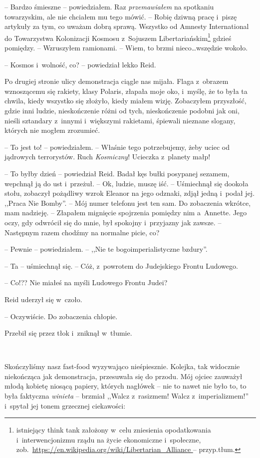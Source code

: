 \documentclass[oneside,polish,11pt,sfheadings]{mwbk}
\begin{document}
-- Bardzo śmieszne -- powiedziałem. Raz \emph{przemawiałem} na spotkaniu
towarzyskim, ale nie chciałem mu tego mówić. -- Robię dziwną pracę i~piszę artykuły za tym, co uważam dobrą sprawą. Wszystko od Amnesty
International do Towarzystwa Kolonizacji Kosmosu z~Sojuszem
Libertariańskim\footnote {istniejący think tank założony w~celu zniesienia opodatkowania i~interwencjonizmu rządu na życie ekonomiczne i~społeczne,
zob.~\url{https://en.wikipedia.org/wiki/Libertarian_Alliance
} -- przyp.tłum.} gdzieś pomiędzy. -- Wzruszyłem ramionami. -- Wiem, to brzmi nieco\ldots wszędzie wokoło.

-- Kosmos i~wolność, co? -- powiedział lekko Reid.

Po drugiej stronie ulicy demonstracja ciągle nas mijała. Flaga z~obrazem
wznoszącemu się rakiety, klasy
Polaris, złapała moje oko, i~myślę, że to była ta chwila, kiedy
wszystko się złożyło, kiedy miałem wizję. Zobaczyłem przyszłość, gdzie
inni ludzie, nieskończenie różni od tych, nieskończenie podobni jak oni,
nieśli sztandary z~innymi i~większymi rakietami, śpiewali nieznane
slogany, których nie mogłem zrozumieć.

-- To jest to! -- powiedziałem. -- Właśnie tego potrzebujemy, żeby uciec od
jądrowych terrorystów. Ruch \emph{Kosmiczny}! Ucieczka z~planety małp!

-- To byłby dzień -- powiedział Reid. Badał kęs bułki posypanej sezamem,
wepchnął ją do ust i~przeżuł. -- Ok, ludzie, muszę iść. -- Uśmiechnął się
dookoła stołu, zobaczył pożądliwy wzrok Eleanor na jego odznaki, zdjął
jedną i~podał jej. ,,Praca Nie Bomby''. -- Mój numer telefonu jest ten sam.
Do zobaczenia wkrótce, mam nadzieję. -- Złapałem mignięcie spojrzenia
pomiędzy nim a~Annette. Jego oczy, gdy odwrócił się do mnie, był
spokojny i~przyjazny jak zawsze. -- Następnym razem chodźmy na normalne
picie, co?

-- Pewnie -- powiedziałem. -- ,,Nie te bogoimperialistyczne bzdury''.

-- Ta -- uśmiechnął się. -- Cóż, z~powrotem do Judejskiego Frontu Ludowego.

-- Co!?? Nie miałeś na myśli Ludowego Frontu Judei?

Reid uderzył się w~czoło. 

-- Oczywiście. Do zobaczenia chłopie.

Przebił się przez tłok i~zniknął w~tłumie.

~

Skończyliśmy nasz fast-food wyzywająco nieśpiesznie. Kolejka, tak
widocznie niekończąca jak demonstracja, przesuwała się do przodu. Mój
ojciec zauważył młodą kobietę niosącą papiery, których nagłówek -- nie to
nawet nie było to, to była faktyczna \emph{winieta} -- brzmiał ,,Walcz z~rasizmem! Walcz z~imperializmem!'' i~spytał jej tonem grzecznej
ciekawości: 
\end{document}
